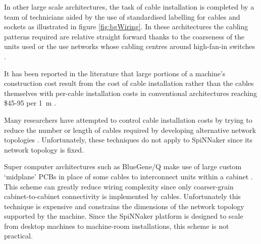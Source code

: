 			In other large scale architectures, the task of cable installation is
			completed by a team of technicians aided by the use of standardised
			labelling for cables and sockets \cite{tia2006} as illustrated in figure
			\ref{fig:bgWiring}. In these architectures the cabling patterns required
			are relative straight forward thanks to the coarseness of the units used
			\cite{lakner07} or the use networks whose cabling centres around
			high-fan-in switches \cite{cisco07,csernai15}.
			
			It has been reported in the literature that large portions of a machine's
			construction cost result from the cost of cable installation rather than
			the cables themselves with per-cable installation costs in conventional
			architectures reaching \$45-95 per \SI{1}{\meter} \cite{mudigonda11}.
			
			Many researchers have attempted to control cable installation costs by
			trying to reduce the number or length of cables required by developing
			alternative network topologies \cite{curtis12, popa10, mudigonda11}.
			Unfortunately, these techniques do not apply to SpiNNaker since its
			network topology is fixed.
			
			Super computer architectures such as BlueGene/Q make use of large custom
			`midplane' PCBs in place of some cables to interconnect units within a
			cabinet \cite{prickett10}. This scheme can greatly reduce wiring
			complexity since only coarser-grain cabinet-to-cabinet connectivity is
			implemented by cables. Unfortunately this technique is expensive and
			constrains the dimensions of the network topology supported by the
			machine. Since the SpiNNaker platform is designed to scale from desktop
			machines to machine-room installations, this scheme is not practical.
			
